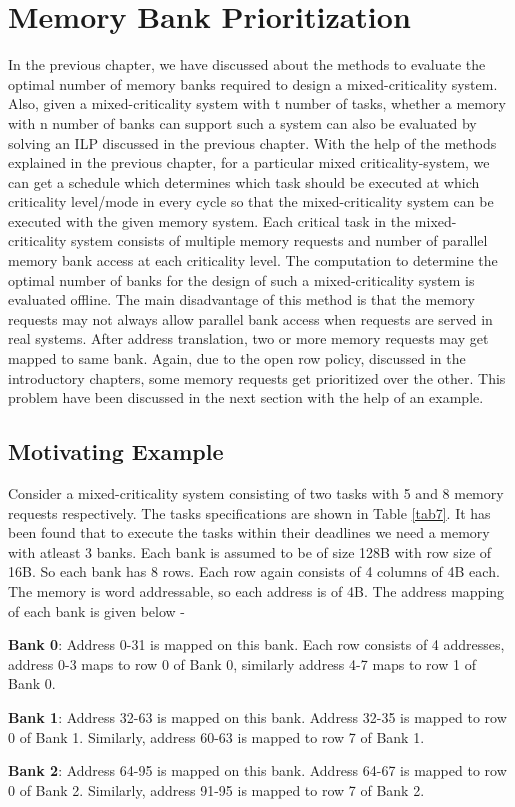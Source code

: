 \chapter{Memory Bank Prioritization}\label{ch5}
\noindent
In the previous chapter, we have discussed about the methods to evaluate the optimal number of memory banks required to design
a mixed-criticality system. Also, given a mixed-criticality system with t number of tasks, whether a memory with n number of 
banks can support such a system can also be evaluated by solving an ILP discussed in the previous chapter. With the help of
the methods explained in the previous chapter, for a particular mixed criticality-system, we can get a schedule which 
determines which task should be executed at which criticality level/mode in every cycle so that the mixed-criticality system 
can be executed with the given memory system. 
\newline
\newline
Each critical task in the mixed-criticality system consists of multiple memory requests and number of parallel memory bank
access at each criticality level. The computation to determine the optimal number of banks for the design of such a 
mixed-criticality system is evaluated offline. The main disadvantage of this method is that the memory requests may not always 
allow parallel bank access when requests are served in real systems. After address translation, two or more memory requests 
may get mapped to same bank. Again, due to the open row policy, discussed in the introductory chapters, some memory requests 
get prioritized over the other. This problem have been discussed in the next section with the help of an example.

\section{Motivating Example}
\noindent
Consider a mixed-criticality system consisting of two tasks with 5 and 8 memory requests respectively. The tasks specifications 
are shown in Table \ref{tab7}. It has been found that to execute the tasks within their deadlines we need a memory with 
atleast 3 banks. Each bank is assumed to be of size 128B with row size of 16B. So each bank has 8 rows. Each row again consists 
of 4 columns of 4B each. The memory is word addressable, so each address is of 4B. The address mapping of each bank is 
given below -
\begin{description}
 \item {\bf Bank 0}: Address 0-31 is mapped on this bank. Each row consists of 4 addresses, address 0-3 maps to row 0 of Bank 0, 
 similarly address 4-7 maps to row 1 of Bank 0.
 \item {\bf Bank 1}: Address 32-63 is mapped on this bank. Address 32-35 is mapped to row 0 of Bank 1. Similarly, address 60-63 is 
 mapped to row 7 of Bank 1.
 \item {\bf Bank 2}: Address 64-95 is mapped on this bank. Address 64-67 is mapped to row 0 of Bank 2. Similarly, address 91-95 is
 mapped to row 7 of Bank 2.
\end{description}

